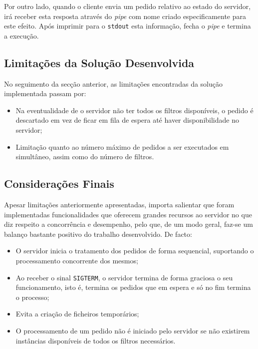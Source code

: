 \documentclass[a4paper, 11pt]{article}
\begin{document}
Por outro lado, quando o cliente envia um pedido relativo ao estado do servidor, irá receber esta 
resposta através do \textit{pipe} com nome criado especificamente para este efeito. Após imprimir 
para o \texttt{stdout} esta informação, fecha o \textit{pipe} e termina a execução.

\vspace{1cm}

\subsection{Limitações da Solução Desenvolvida}

No seguimento da secção anterior, as limitações encontradas da solução implementada passam 
por:

\begin{itemize}
    \item Na eventualidade de o servidor não ter todos os filtros disponíveis, o pedido é 
descartado em vez de ficar em fila de espera até haver disponibilidade no servidor;
    \item Limitação quanto ao número máximo de pedidos a ser executados em simultâneo, assim 
como do número de filtros. 
\end{itemize}

\pagebreak

\subsection{Considerações Finais}

Apesar limitações anteriormente apresentadas, importa salientar que foram implementadas 
funcionalidades que oferecem grandes recursos ao servidor no que diz respeito a concorrência e 
desempenho, pelo que, de um modo geral, faz-se um balanço bastante positivo do trabalho 
desenvolvido. De facto:

\begin{itemize}
    \item O servidor inicia o tratamento dos pedidos de forma sequencial, suportando o 
processamento concorrente dos mesmos;
    \item Ao receber o sinal \texttt{SIGTERM}, o servidor termina de forma graciosa o seu 
funcionamento, isto é, termina
    os pedidos que em espera e só no fim termina o processo;
    \item Evita a criação de ficheiros temporários;
    \item O processamento de um pedido não é iniciado pelo servidor se não existirem instâncias 
disponíveis de todos os filtros necessários.
\end{itemize}
\end{document}

